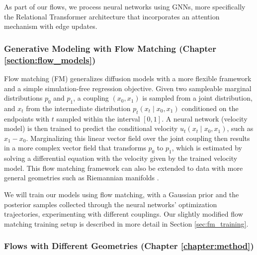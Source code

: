 As part of our flows, we process neural networks using GNNs, more specifically the Relational Transformer architecture \citep{diaoRelationalAttentionGeneralizing2023,kofinasGraphNeuralNetworks2024} that incorporates an attention mechanism with edge updates. 

\subsubsection{Generative Modeling with Flow Matching (Chapter \ref{section:flow_models})}

Flow matching (FM) \citep{lipmanFlowMatchingGenerative2023,albergoStochasticInterpolantsUnifying2023,liuFlowStraightFast2022,tongImprovingGeneralizingFlowbased2023} generalizes diffusion models with a more flexible framework and a simple simulation-free regression objective. Given two sampleable marginal distributions $p_0$ and $p_1$, a coupling $(x_0, x_1)$ is sampled from a joint distribution, and $x_t$ from the intermediate distribution $p_t(x_t \mid x_0, x_1)$ conditioned on the endpoints with $t$ sampled within the interval $[0,1]$. A neural network (velocity model) is then trained to predict the conditional velocity $u_t(x_t \mid x_0, x_1)$, such as $x_1 - x_0$. Marginalizing this linear vector field over the joint coupling then results in a more complex vector field that transforms $p_0$ to $p_1$, which is estimated by solving a differential equation with the velocity given by the trained velocity model. This flow matching framework can also be extended to data with more general geometries such as Riemannian manifolds \citep{chenRiemannianFlowMatching2023}. 

We will train our models using flow matching, with a Gaussian prior and the posterior samples collected through the neural networks' optimization trajectories, experimenting with different couplings. Our slightly modified flow matching training setup is described in more detail in Section \ref{sec:fm_training}.

\subsubsection{Flows with Different Geometries (Chapter \ref{chapter:method})}

